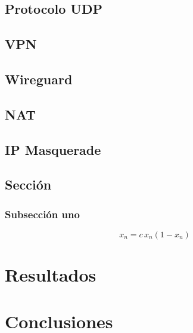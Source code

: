 \documentclass[letterpaper,12pt,oneside]{book}
\begin{document}
\section{Protocolo UDP} %
\section{VPN} %
\section{Wireguard} %

\section{NAT} %
\section{IP Masquerade} %

  

\section{Sección}
    
    \subsection{Subsecci\'on uno}
    \begin{equation}
    	x_n = c \, x_n(1 - x_n)
    	\label{Ec:logis}
    \end{equation}

\chapter{Resultados}  %

\chapter{Conclusiones}  %

%


\backmatter%
\end{document}
